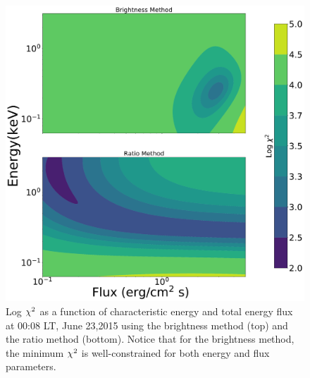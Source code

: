 \begin{figure}
	\centering\includegraphics[width=32pc]{chi_b_vs_e_08.pdf}
	\caption{Log $\rm \chi^2$ as a function of characteristic energy and total energy flux at 00:08 LT, June 23,2015 using the brightness method (top) and the ratio method (bottom). Notice that for the brightness method, the minimum $\rm \chi^2$ is well-constrained for both energy and flux parameters.}
	\label{fig:chi_08}
\end{figure}
